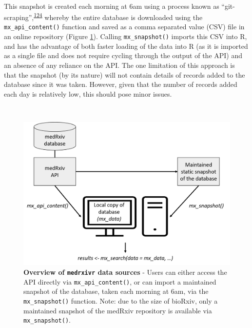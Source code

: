 \documentclass[a4paper, twoside]{templates/ociamthesis}
\begin{document}
~

This snapshot is created each morning at 6am using a process known as ``git-scraping'',\textsuperscript{\protect\hyperlink{ref-zotero-15031}{124}} whereby the entire database is downloaded using the \texttt{mx\_api\_content()} function and saved as a comma separated value (CSV) file in an online repository (Figure \ref{fig:medrxivr-data-sources}). Calling \texttt{mx\_snapshot()} imports this CSV into R, and has the advantage of both faster loading of the data into R (as it is imported as a single file and does not require cycling through the output of the API) and an absence of any reliance on the API. The one limitation of this approach is that the snapshot (by its nature) will not contain details of records added to the database since it was taken. However, given that the number of records added each day is relatively low, this should pose minor issues.

~





\begin{figure}[H]
\includegraphics[width=1\linewidth]{figures/sys-rev-tools/data_sources} \caption[Overview of \texttt{medrxivr} data sources]{\textbf{Overview of \texttt{medrxivr} data sources} - Users can either access the API directly via \texttt{mx\_api\_content()}, or can import a maintained snapshot of the database, taken each morning at 6am, via the \texttt{mx\_snapshot()} function. Note: due to the size of bioRxiv, only a maintained snapshot of the medRxiv repository is available via \texttt{mx\_snapshot()}.}\label{fig:medrxivr-data-sources}
\end{figure}
\end{document}
